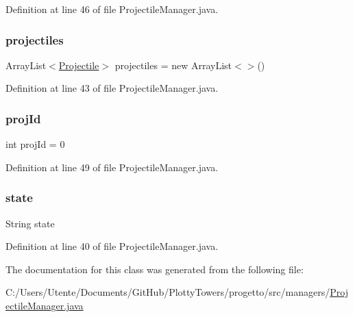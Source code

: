 Definition at line 46 of file Projectile\+Manager.\+java.

\mbox{\label{classmanagers_1_1_projectile_manager_ab15956ed089bc9c0fb7ba6c8494fe5c7}} 
\subsubsection{\texorpdfstring{projectiles}{projectiles}}
{\footnotesize\ttfamily Array\+List$<$\hyperlink{classobjects_1_1_projectile}{Projectile}$>$ projectiles = new Array\+List$<$$>$()\hspace{0.3cm}{\ttfamily [private]}}



Definition at line 43 of file Projectile\+Manager.\+java.

\mbox{\label{classmanagers_1_1_projectile_manager_a9705bce400d9f98d3cb9f77460f99aad}} 
\subsubsection{\texorpdfstring{proj\+Id}{projId}}
{\footnotesize\ttfamily int proj\+Id = 0\hspace{0.3cm}{\ttfamily [private]}}



Definition at line 49 of file Projectile\+Manager.\+java.

\mbox{\label{classmanagers_1_1_projectile_manager_a91ac952876f776b3fbbc8519e093fdbf}} 
\subsubsection{\texorpdfstring{state}{state}}
{\footnotesize\ttfamily String state\hspace{0.3cm}{\ttfamily [private]}}



Definition at line 40 of file Projectile\+Manager.\+java.



The documentation for this class was generated from the following file\+:\begin{DoxyCompactItemize}
\item 
C\+:/\+Users/\+Utente/\+Documents/\+Git\+Hub/\+Plotty\+Towers/progetto/src/managers/\hyperlink{_projectile_manager_8java}{Projectile\+Manager.\+java}\end{DoxyCompactItemize}
